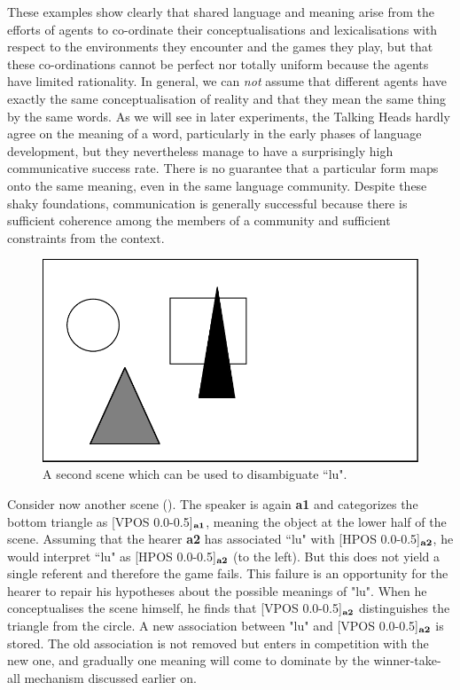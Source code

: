 These examples show clearly that shared language and meaning 
arise from the efforts of agents to co-ordinate their
conceptualisations and lexicalisations with respect 
to the environments they encounter and the games they play, 
but that these co-ordinations cannot be perfect nor totally 
uniform because the agents have limited rationality. 
In general, we can {\it not} assume that different agents
have exactly the same 
conceptualisation of reality and that they mean the same thing by 
the same words. As we will see in later experiments, the
Talking Heads hardly agree on the meaning of a word, particularly 
in the early phases of language development, but they 
nevertheless manage to have a surprisingly high communicative success
rate. There is no guarantee that a particular 
form maps onto the same meaning, even in the same language community.
Despite these shaky foundations, communication is generally 
successful because there is sufficient coherence among the members of 
a community and sufficient constraints from the context. 

\begin{figure}[htbp]
  \centerline{\includegraphics[width=.50\textwidth]{chap2/figs/scene1-2}}
\caption{\label{scene1-2} A second scene which 
can be used to disambiguate ``lu".}
\end{figure}
Consider now another scene (). The speaker
is again {\bf a1} and categorizes the bottom triangle as 
[VPOS 0.0-0.5]$_{\bf a1}$, meaning
the object at the lower half of the scene. Assuming that the
hearer {\bf a2} has associated ``lu" with [HPOS 0.0-0.5]$_{\bf a2}$, he
would interpret ``lu" as [HPOS 0.0-0.5]$_{\bf a2}$ (to the left). But this 
does not yield a single 
referent and therefore the game fails. 
This failure is an opportunity for the hearer to repair his 
hypotheses about the possible meanings of "lu".
When he conceptualises the scene himself, 
he finds that [VPOS 0.0-0.5]$_{\bf a2}$ distinguishes the triangle
from the circle. A new association between 
"lu" and [VPOS 0.0-0.5]$_{\bf a2}$ is stored. The old association
is not removed but enters in competition with the new
one, and gradually one meaning will come to dominate
by the winner-take-all mechanism discussed earlier on. 

